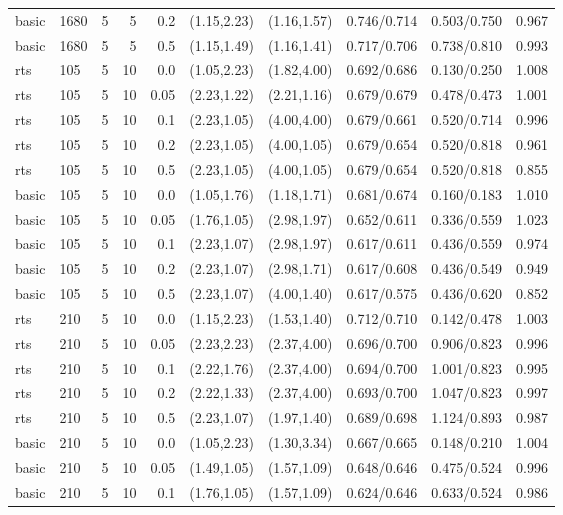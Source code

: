 \begin{tabular}{llrrrccccc}
basic & 1680 & 5 & 5 & 0.2 & (1.15,2.23) & (1.16,1.57) & 0.746/0.714 & 0.503/0.750 & 0.967 \\
basic & 1680 & 5 & 5 & 0.5 & (1.15,1.49) & (1.16,1.41) & 0.717/0.706 & 0.738/0.810 & 0.993 \\
rts & 105 & 5 & 10 & 0.0 & (1.05,2.23) & (1.82,4.00) & 0.692/0.686 & 0.130/0.250 & 1.008 \\
rts & 105 & 5 & 10 & 0.05 & (2.23,1.22) & (2.21,1.16) & 0.679/0.679 & 0.478/0.473 & 1.001 \\
rts & 105 & 5 & 10 & 0.1 & (2.23,1.05) & (4.00,4.00) & 0.679/0.661 & 0.520/0.714 & 0.996 \\
rts & 105 & 5 & 10 & 0.2 & (2.23,1.05) & (4.00,1.05) & 0.679/0.654 & 0.520/0.818 & 0.961 \\
rts & 105 & 5 & 10 & 0.5 & (2.23,1.05) & (4.00,1.05) & 0.679/0.654 & 0.520/0.818 & 0.855 \\
basic & 105 & 5 & 10 & 0.0 & (1.05,1.76) & (1.18,1.71) & 0.681/0.674 & 0.160/0.183 & 1.010 \\
basic & 105 & 5 & 10 & 0.05 & (1.76,1.05) & (2.98,1.97) & 0.652/0.611 & 0.336/0.559 & 1.023 \\
basic & 105 & 5 & 10 & 0.1 & (2.23,1.07) & (2.98,1.97) & 0.617/0.611 & 0.436/0.559 & 0.974 \\
basic & 105 & 5 & 10 & 0.2 & (2.23,1.07) & (2.98,1.71) & 0.617/0.608 & 0.436/0.549 & 0.949 \\
basic & 105 & 5 & 10 & 0.5 & (2.23,1.07) & (4.00,1.40) & 0.617/0.575 & 0.436/0.620 & 0.852 \\
rts & 210 & 5 & 10 & 0.0 & (1.15,2.23) & (1.53,1.40) & 0.712/0.710 & 0.142/0.478 & 1.003 \\
rts & 210 & 5 & 10 & 0.05 & (2.23,2.23) & (2.37,4.00) & 0.696/0.700 & 0.906/0.823 & 0.996 \\
rts & 210 & 5 & 10 & 0.1 & (2.22,1.76) & (2.37,4.00) & 0.694/0.700 & 1.001/0.823 & 0.995 \\
rts & 210 & 5 & 10 & 0.2 & (2.22,1.33) & (2.37,4.00) & 0.693/0.700 & 1.047/0.823 & 0.997 \\
rts & 210 & 5 & 10 & 0.5 & (2.23,1.07) & (1.97,1.40) & 0.689/0.698 & 1.124/0.893 & 0.987 \\
basic & 210 & 5 & 10 & 0.0 & (1.05,2.23) & (1.30,3.34) & 0.667/0.665 & 0.148/0.210 & 1.004 \\
basic & 210 & 5 & 10 & 0.05 & (1.49,1.05) & (1.57,1.09) & 0.648/0.646 & 0.475/0.524 & 0.996 \\
basic & 210 & 5 & 10 & 0.1 & (1.76,1.05) & (1.57,1.09) & 0.624/0.646 & 0.633/0.524 & 0.986 \\

\end{tabular}

